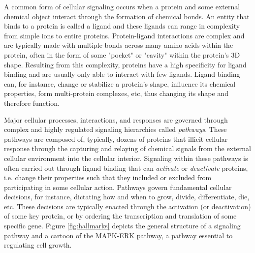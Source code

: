 A common form of cellular signaling occurs when a protein and some external chemical object interact through the formation of chemical bonds.
An entity that binds to a protein is called a ligand and these ligands can range in complexity from simple ions to entire proteins.
Protein-ligand interactions are complex and are typically made with multiple bonds across many amino acids within the protein, often in the form of some "pocket" or "cavity" within the protein's 3D shape.
Resulting from this complexity, proteins have a high specificity for ligand binding and are usually only able to interact with few ligands.
Ligand binding can, for instance, change or stabilize a protein's shape, influence its chemical properties, form multi-protein complexes, etc, thus changing its shape and therefore function.

Major cellular processes, interactions, and responses are governed through complex and highly regulated signaling hierarchies called \emph{pathways}.
These pathways are composed of, typically, dozens of proteins that illicit cellular response through the capturing and relaying of chemical signals from the external cellular environment into the cellular interior.
Signaling within these pathways is often carried out through ligand binding that can \emph{activate} or \emph{deactivate} proteins, i.e. change their properties such that they included or excluded from participating in some cellular action.
Pathways govern fundamental cellular decisions, for instance, dictating how and when to grow, divide, differentiate, die, etc.
These decisions are typically enacted through the activation (or deactivation) of some key protein, or by ordering the transcription and translation of some specific gene.
Figure \ref{fig:hallmarks} depicts the general structure of a signaling pathway and a cartoon of the MAPK-ERK pathway, a pathway essential to regulating cell growth.

